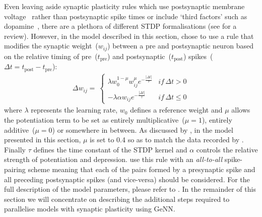 \documentclass[utf8]{frontiersSCNS} %
\begin{document}
Even leaving aside synaptic plasticity rules which use postsynaptic membrane voltage~\citep{Brader2007,Clopath2010c} rather than postsynaptic spike times or include `third factors' such as dopamine~\citep{Izhikevich2007}, there are a plethora of different STDP formalisations (see \citet{Morrison2008} for a review).
However, in the model described in this section, \citet{Morrison2007} chose to use a rule that modifies the synaptic weight~($w_{ij}$) between a pre and postsynaptic neuron based on the relative timing of pre~($t_{\text{pre}}$) and postsynaptic~($t_{\text{post}}$) spikes~($\Delta t = t_{\text{post}} - t_{\text{pre}}$):
%
\begin{align}
    \Delta w_{ij} = \
        \begin{cases}
            \lambda w_{0}^{1-\mu} w_{ij}^{\mu} e^{-\frac{|\Delta t|}{\tau}} & if\, \Delta t>0\\
            -\lambda \alpha w_{ij} e^{-\frac{|\Delta t|}{\tau}}             & if\, \Delta t\leq0
        \end{cases}\label{eq:mad_stdp}
\end{align}
%
where $\lambda$ represents the learning rate, $w_{0}$ defines a reference weight and $\mu$ allows the potentiation term to be set as entirely multiplicative~($\mu=1$), entirely additive~($\mu=0$) or somewhere in between.
As discussed by \citet{Morrison2007}, in the model presented in this section, $\mu$ is set to \num{0.4} so as to match the data recorded by \citet{Bi1998}.
Finally $\tau$ defines the time constant of the STDP kernel and $\alpha$ controls the relative strength of potentiation and depression.
\citeauthor{Morrison2007} use this rule with an \textit{all-to-all} spike-pairing scheme meaning that each of the pairs formed by a presynaptic spike and all preceding postsynaptic spikes (and vice-versa) should be considered.
For the full description of the model parameters, please refer to \citet[sections 3 and 4.1]{Morrison2007}.
In the remainder of this section we will concentrate on describing the additional steps required to parallelise models with synaptic plasticity using GeNN.
\end{document}
